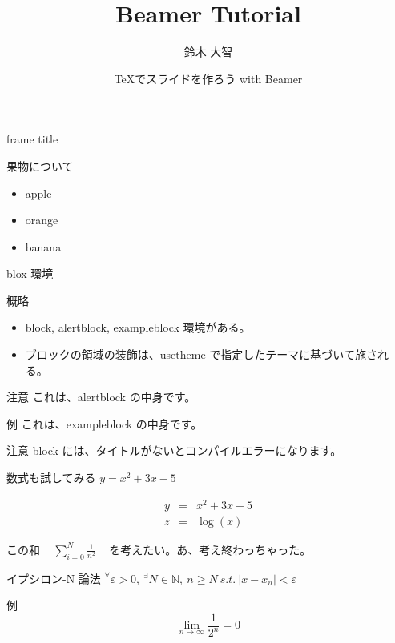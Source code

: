\documentclass[dvipdfmx, 12pt]{beamer}  %
\title{Beamer Tutorial}
\author{鈴木 大智}
\date[2021/02/23]{\TeX でスライドを作ろう with Beamer}
\institute[日本大学大学院]{日本大学大学院 理工学研究科 数学専攻}
\begin{document}
\frame{\maketitle}

\begin{frame}{frame title}

  果物について
  
  \begin{itemize}
    \item apple
    \item orange
    \item banana
  \end{itemize}
\end{frame}

\begin{frame}{blox 環境}

  \begin{block}{概略}
    \begin{itemize}
      \item block, alertblock, exampleblock 環境がある。
      \item ブロックの領域の装飾は、usetheme で指定したテーマに基づいて施される。
    \end{itemize}
  \end{block}

  \begin{alertblock}{注意}
    これは、alertblock の中身です。
  \end{alertblock}

  \begin{exampleblock}{例}
    これは、exampleblock の中身です。
  \end{exampleblock}

  \begin{alertblock}{注意}
    block には、タイトルがないとコンパイルエラーになります。
  \end{alertblock}

\end{frame}


\begin{frame}{数式も試してみる}
  $y = x^2 + 3x -5$

  \begin{eqnarray*}
    y &=& x^2 + 3x -5 \\
    z &=& \log(x)
  \end{eqnarray*}

  この和 ~ $ {\displaystyle
    \sum_{i=0}^{N} \frac{1}{n^2}
  } $ ~ を考えたい。あ、考え終わっちゃった。

  \begin{block}{ イプシロン-N 論法 }
    $ {\displaystyle
      {}^{\forall} \varepsilon > 0, ~ {}^{\exists} N \in \mathbb{N}, ~ n \geq N ~
      s.t. ~ | x - x_n | < \varepsilon
    } $
  \end{block}

  \begin{exampleblock}{例}
    \begin{displaymath}
      \lim_{n \rightarrow \infty} \frac{1}{2^n} = 0
    \end{displaymath}
  \end{exampleblock}

\end{frame}

\end{document}
